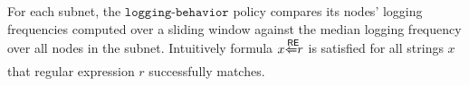 \documentclass[a4paper,headings=normal]{scrartcl}
\newcommand{\matches}{\mathsf{\xLeftarrow{\!\!\!\!\!\!\!\!\!RE\!\!\!\!\!\!\!\!\!}}}
\newcommand*{\LoggingBehavior}{\texttt{logging-behavior}}
\begin{document}
For each subnet, the $\LoggingBehavior$ policy compares its nodes' logging frequencies
computed over a sliding window against the median logging frequency over all nodes in the subnet.
Intuitively formula $x\matches r$ is satisfied for all strings $x$ that regular expression $r$ successfully matches.
\end{document}
